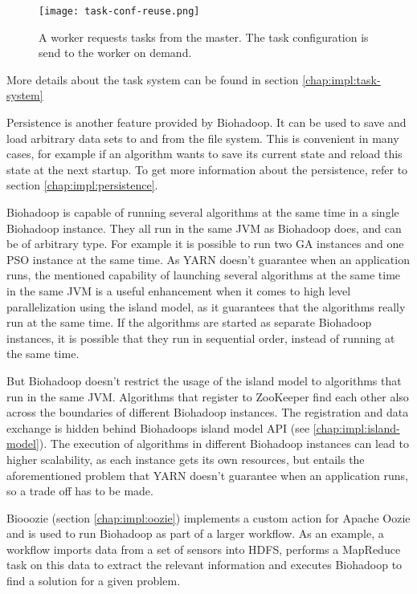 \begin{figure}[ht!]
  \centering
  \texttt{[image: task-conf-reuse.png]}
  \caption{A worker requests tasks from the master. The task configuration is send to the worker on demand.}
  \label{fig:task-conf-reuse}
\end{figure}

More details about the task system can be found in section \ref{chap:impl:task-system}

Persistence is another feature provided by Biohadoop. It can be used to save and load arbitrary data sets to and from the file system. This is convenient in many cases, for example if an algorithm wants to save its current state and reload this state at the next startup. To get more information about the persistence, refer to section \ref{chap:impl:persistence}.

Biohadoop is capable of running several algorithms at the same time in a single Biohadoop instance. They all run in the same JVM as Biohadoop does, and can be of arbitrary type. For example it is possible to run two GA instances and one PSO instance at the same time. As YARN doesn't guarantee when an application runs, the mentioned capability of launching several algorithms at the same time in the same JVM is a useful enhancement when it comes to high level parallelization using the island model, as it guarantees that the algorithms really run at the same time. If the algorithms are started as separate Biohadoop instances, it is possible that they run in sequential order, instead of running at the same time.

But Biohadoop doesn't restrict the usage of the island model to algorithms that run in the same JVM. Algorithms that register to ZooKeeper \cite{zookeeper} find each other also across the boundaries of different Biohadoop instances. The registration and data exchange is hidden behind Biohadoops island model API (see \ref{chap:impl:island-model}). The execution of algorithms in different Biohadoop instances can lead to higher scalability, as each instance gets its own resources, but entails the aforementioned problem that YARN doesn't guarantee when an application runs, so a trade off has to be made.

Biooozie (section \ref{chap:impl:oozie}) implements a custom action for Apache Oozie and is used to run Biohadoop as part of a larger workflow. As an example, a workflow imports data from a set of sensors into HDFS, performs a MapReduce task on this data to extract the relevant information and executes Biohadoop to find a solution for a given problem.

